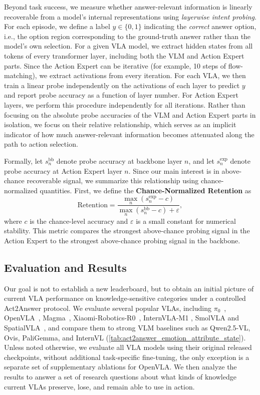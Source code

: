 \documentclass{llmxive}
\begin{document}
Beyond task success, we measure whether answer-relevant information is linearly recoverable from a model's internal representations using \emph{layerwise intent probing}.
For each episode, we define a label $y \in \{0,1\}$ indicating the \emph{correct} answer option, i.e., the option region corresponding to the ground-truth answer rather than the model's own selection.
For a given VLA model, we extract hidden states from all tokens of every transformer layer, including both the VLM and Action Expert parts. Since the Action Expert can be iterative (for example, 10 steps of flow-matching), we extract activations from every iteration. For each VLA, we then train a linear probe independently on the activations of each layer to predict $y$ and report probe accuracy as a function of layer number. For Action Expert layers, we perform this procedure independently for all iterations. Rather than focusing on the absolute probe accuracies of the VLM and Action Expert parts in isolation, we focus on their relative relationship, which serves as an implicit indicator of how much answer-relevant information becomes attenuated along the path to action selection.

Formally, let $s_n^{\mathrm{bb}}$ denote probe accuracy at backbone layer $n$, and let $s_n^{\mathrm{exp}}$ denote probe accuracy at Action Expert layer $n$. Since our main interest is in above-chance recoverable signal, we summarize this relationship using chance-normalized quantities. First, we define the \textbf{Chance-Normalized Retention} as
\[
\mathrm{Retention}
=
\frac{\max_n (s_n^{\mathrm{exp}}-c)}{\max_n (s_n^{\mathrm{bb}}-c)+\varepsilon},
\]
where $c$ is the chance-level accuracy and $\varepsilon$ is a small constant for numerical stability. This metric compares the strongest above-chance probing signal in the Action Expert to the strongest above-chance probing signal in the backbone.

\subsection{Evaluation and Results}

Our goal is not to establish a new leaderboard, but to obtain an initial picture of current VLA performance on knowledge-sensitive categories under a controlled Act2Answer protocol. We evaluate several popular VLAs, including $\pi_0$~\citep{pi0}, OpenVLA~\citep{openvla}, Magma~\citep{magma}, Xiaomi-Robotics-R0~\citep{xiaomirobotics}, InternVLA-M1 \citep{chen2025internvla}, SmolVLA \citep{smolvla} and SpatialVLA~\citep{spatialvla}, and compare them to strong VLM baselines such as Qwen2.5-VL, Ovis, PaliGemma, and InternVL (\autoref{tab:act2answer_emotion_attribute_state}). Unless noted otherwise, we evaluate all VLA models using their original released checkpoints, without additional task-specific fine-tuning, the only exception is a separate set of supplementary ablations for OpenVLA. We then analyze the results to answer a set of research questions about what kinds of knowledge current VLAs preserve, lose, and remain able to use in action.
\end{document}
